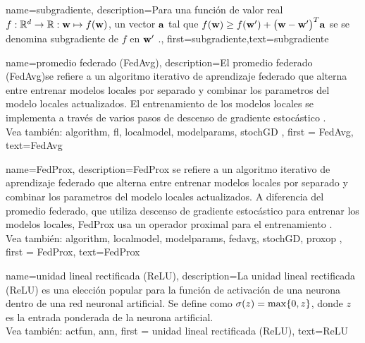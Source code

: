 {name={subgradiente},
description={Para una función de valor real $f: \mathbb{R}^{d} \rightarrow \mathbb{R}: {\bf w} \mapsto f({\bf w})$, 
		un vector ${\bf a}$ tal que $f({\bf w}) \geq  f({\bf w}') +\big({\bf w}-{\bf w}' \big)^{T} {\bf a}$ se 
		se denomina subgradiente de $f$ en ${\bf w}'$ \cite{BertCvxAnalOpt,BertsekasNonLinProgr}.},
	first={subgradiente},text={subgradiente} 
}

{name={promedio federado (FedAvg)},
	description={El promedio federado (FedAvg)se refiere a un algoritmo iterativo de aprendizaje federado que alterna entre entrenar modelos locales por separado y combinar los parametros del modelo locales actualizados.
		El entrenamiento de los modelos locales se implementa a través de varios pasos de descenso de gradiente estocástico  \cite{pmlr-v54-mcmahan17a}.
		\\
		Vea también: \gls{algorithm}, \gls{fl}, \gls{localmodel}, \gls{modelparams}, \gls{stochGD} }, 
		first = {FedAvg}, text={FedAvg} 
}

{name={FedProx},
	description={FedProx  se refiere a un algoritmo iterativo de aprendizaje federado que alterna entre entrenar modelos locales por separado y combinar los parametros del modelo locales actualizados. 
		A diferencia del promedio federado, que utiliza descenso de gradiente estocástico para entrenar los modelos locales, FedProx usa un operador proximal para el entrenamiento \cite{FedProx2020}.
		\\
		Vea también: \gls{algorithm}, \gls{localmodel}, \gls{modelparams}, \gls{fedavg}, \gls{stochGD}, \gls{proxop} }, 
	first = {FedProx}, text={FedProx} 
}

{name={unidad lineal rectificada (ReLU)},
	description={La unidad lineal rectificada (ReLU) es una elección popular para la 
		función de activación de una neurona dentro de una red neuronal artificial. Se define como  
		$\sigma(z) = \max\{0,z\}$, donde $z$ es la entrada ponderada de la neurona artificial.
		\\
		Vea también: \gls{actfun}, \gls{ann}}, 
	first = {unidad lineal rectificada (ReLU)}, text={ReLU} 
}

